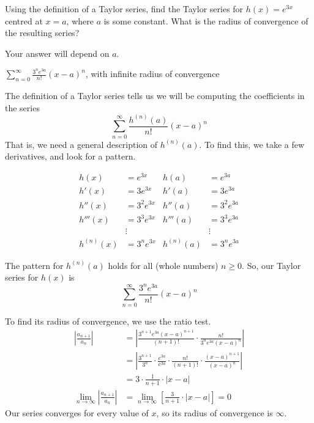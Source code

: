 \begin{Mquestion}\label{TSdef2}\label{prob_s3.6:e3x}
Using the definition of a Taylor series, find the Taylor series for $h(x)=e^{3x}$ centred at $x=a$, where $a$ is some constant. What is the radius of convergence of the resulting series?
\end{Mquestion}
\begin{hint}
	Your answer will depend on $a$.
\end{hint}
\begin{answer}
	$\displaystyle \sum_{n=0}^\infty \frac{3^ne^{3a} }{n!}(x-a)^n$, with infinite radius of convergence
\end{answer}
\begin{solution}
	The definition of a Taylor series tells us we will be computing the coefficients in the series
	\[\sum_{n=0}^\infty \frac{h^{(n)}(a)}{n!}(x-a)^n\]
	That is, we need a general description of $h^{(n)}(a)$. To find this, we take a few derivatives, and look for a pattern.

	\begin{align*}
	h(x)&=e^{3x} & h(a)&=e^{3a}\\
	h'(x)&=3e^{3x} & h'(a)&=3e^{3a}\\
	h''(x)&=3^2e^{3x} & h''(a)&=3^2e^{3a}\\
	h'''(x)&=3^3e^{3x} & h'''(a)&=3^3e^{3a}\\
	&\vdots&&\vdots\\
	h^{(n)}(x)&=3^{n}e^{3x} & h^{(n)}(a)&=3^{n}e^{3a}
		\end{align*}

The pattern for $h^{(n)}(a)$ holds for all (whole numbers) $n \ge 0$. So, our Taylor series for $h(x)$ is
	\[\sum_{n=0}^\infty \frac{3^ne^{3a} }{n!}(x-a)^n\]

To find its radius of convergence, we use the ratio test.
\begin{align*}
\left|\frac{a_{n+1}}{a_n}\right|&=\left|\frac{3^{n+1}e^{3a} (x-a)^{n+1}}{(n+1)!}\cdot {\frac{n!}{3^ne^{3a}(x-a)^n }}\right|\\
&=\left|\frac{3^{n+1}}{3^n}\cdot\frac{e^{3a}}{e^{3a}}\cdot \frac{n!}{(n+1)!}\cdot\frac{(x-a)^{n+1}}{(x-a)^n}\right|\\
&=3\cdot\frac{1}{n+1}\cdot |x-a|\\
\lim_{n \to \infty }\left|\frac{a_{n+1}}{a_n}\right|&=\lim_{n \to \infty}\left[\frac{3}{n+1}\cdot |x-a|\right]=0
\end{align*}
Our series converges for every value of $x$, so its radius of convergence is $\infty$.
\end{solution}

